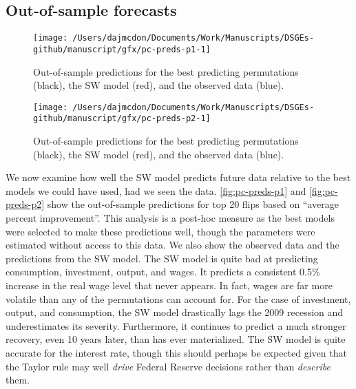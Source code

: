 \documentclass[11pt]{article}
\begin{document}
\hypertarget{out-of-sample-forecasts}{%
\subsection{Out-of-sample forecasts}\label{out-of-sample-forecasts}}

\begin{figure}[t]

{\centering \texttt{[image: /Users/dajmcdon/Documents/Work/Manuscripts/DSGEs-github/manuscript/gfx/pc-preds-p1-1]} 

}

\caption{Out-of-sample predictions for the best predicting permutations (black), the SW model (red), and the observed data (blue).}\label{fig:pc-preds-p1}
\end{figure}

\begin{figure}[t]

{\centering \texttt{[image: /Users/dajmcdon/Documents/Work/Manuscripts/DSGEs-github/manuscript/gfx/pc-preds-p2-1]} 

}

\caption{Out-of-sample predictions for the best predicting permutations (black), the SW model (red), and the observed data (blue).}\label{fig:pc-preds-p2}
\end{figure}

We now examine how well the SW model predicts future data relative to
the best models we could have used, had we seen the data.
\autoref{fig:pc-preds-p1} and \autoref{fig:pc-preds-p2} show the
out-of-sample predictions for top 20 flips based on ``average percent
improvement''. This analysis is a post-hoc measure as the best models
were selected to make these predictions well, though the parameters were
estimated without access to this data. We also show the observed data
and the predictions from the SW model. The SW model is quite bad at
predicting consumption, investment, output, and wages. It predicts a
consistent 0.5\% increase in the real wage level that never appears. In
fact, wages are far more volatile than any of the permutations can
account for. For the case of investment, output, and consumption, the SW
model drastically lags the 2009 recession and underestimates its
severity. Furthermore, it continues to predict a much stronger recovery,
even 10 years later, than has ever materialized. The SW model is quite
accurate for the interest rate, though this should perhaps be expected
given that the Taylor rule may well \emph{drive} Federal Reserve
decisions rather than \emph{describe} them.
\end{document}
